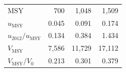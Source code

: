 \begin{table}[tp]
\begin{tabular}{lrrr}
$\mathrm{MSY}$                    & 700 & 1,048 & 1,509 \\
$u_\mathrm{MSY}$       & 0.045 & 0.091 & 0.174 \\
$u_{2012} / u_\mathrm{MSY}$ & 0.134 & 0.384 & 1.434 \\

$V_\mathrm{MSY}$       & 7,586 & 11,729 & 17,112 \\
$V_\mathrm{MSY} / V_0$ & 0.213 & 0.301 & 0.379 \\
\hline
\end{tabular}	
\end{table}

\clearpage




